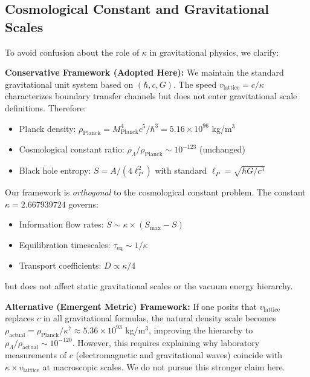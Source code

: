 \documentclass[11pt]{article}
\begin{document}
\subsection{Cosmological Constant and Gravitational Scales}

To avoid confusion about the role of $\kappa$ in gravitational physics, we clarify:

\textbf{Conservative Framework (Adopted Here):} We maintain the standard gravitational unit system based on $(\hbar, c, G)$. The speed $v_{\text{lattice}} = c/\kappa$ characterizes boundary transfer channels but does not enter gravitational scale definitions. Therefore:
\begin{itemize}
  \item Planck density: $\rho_{\text{Planck}} = M_{\text{Planck}}^4 c^5/\hbar^3 = 5.16 \times 10^{96}$ kg/m$^3$
  \item Cosmological constant ratio: $\rho_\Lambda/\rho_{\text{Planck}} \sim 10^{-123}$ (unchanged)
  \item Black hole entropy: $S = A/(4\ell_P^2)$ with standard $\ell_P = \sqrt{\hbar G/c^3}$
\end{itemize}

Our framework is \emph{orthogonal} to the cosmological constant problem. The constant $\kappa = 2.667939724$ governs:
\begin{itemize}
  \item Information flow rates: $\dot{S} \sim \kappa \times (S_{\text{max}} - S)$
  \item Equilibration timescales: $\tau_{\text{eq}} \sim 1/\kappa$
  \item Transport coefficients: $D \propto \kappa/4$
\end{itemize}
but does not affect static gravitational scales or the vacuum energy hierarchy.

\textbf{Alternative (Emergent Metric) Framework:} If one posits that $v_{\text{lattice}}$ replaces $c$ in all gravitational formulas, the natural density scale becomes $\rho_{\text{actual}} = \rho_{\text{Planck}}/\kappa^7 \approx 5.36 \times 10^{93}$ kg/m$^3$, improving the hierarchy to $\rho_\Lambda/\rho_{\text{actual}} \sim 10^{-120}$. However, this requires explaining why laboratory measurements of $c$ (electromagnetic and gravitational waves) coincide with $\kappa \times v_{\text{lattice}}$ at macroscopic scales. We do not pursue this stronger claim here.
\end{document}
